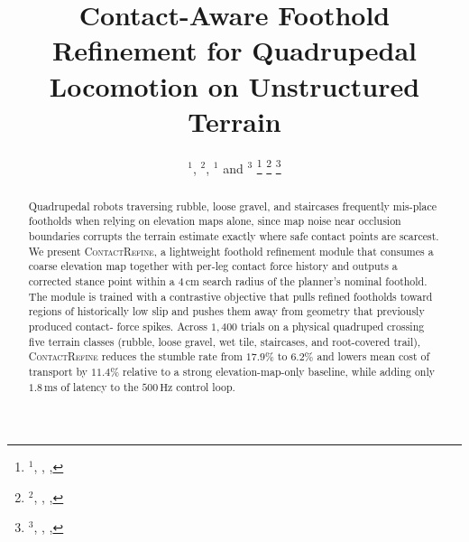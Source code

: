 \documentclass[letterpaper, 10 pt, conference]{ieeeconf}
\title{\LARGE \bf
Contact-Aware Foothold Refinement for Quadrupedal Locomotion on Unstructured Terrain}
\author{\censor{Femi Oyelaran}$^{1}$, \censor{Ingrid Roos}$^{2}$, \censor{Sora Tanaka}$^{1}$
and \censor{Manon Delacroix}$^{3}$%
\thanks{$^{1}$\protect\censor{Department of Robotics Engineering},
  \protect\censor{Nimbus Institute of Technology}, \protect\censor{Rindalen, Norway},
  {\tt\small \protect\censor{f.oyelaran@nimbus-tech.example}}}%
\thanks{$^{2}$\protect\censor{Vertex Robotics Laboratory}, \protect\censor{Meridian University},
  \protect\censor{Coimbra, Portugal}, {\tt\small \protect\censor{i.roos@meridian-univ.example}}}%
\thanks{$^{3}$\protect\censor{Applied Autonomy Group}, \protect\censor{Synapse Research},
  \protect\censor{Lyon, France}, {\tt\small \protect\censor{m.delacroix@synapse.example}}}%
}
\begin{document}
\maketitle
\thispagestyle{empty}
\pagestyle{empty}

\noindent{}

\begin{abstract}
Quadrupedal robots traversing rubble, loose gravel, and staircases frequently mis-place
footholds when relying on elevation maps alone, since map noise near occlusion boundaries
corrupts the terrain estimate exactly where safe contact points are scarcest. We present
\textsc{ContactRefine}, a lightweight foothold refinement module that consumes a coarse
elevation map together with per-leg contact force history and outputs a corrected stance
point within a $4\,\text{cm}$ search radius of the planner's nominal foothold. The module is
trained with a contrastive objective that pulls refined footholds toward regions of
historically low slip and pushes them away from geometry that previously produced contact-
force spikes. Across $1{,}400$ trials on a physical quadruped crossing five terrain classes
(rubble, loose gravel, wet tile, staircases, and root-covered trail), \textsc{ContactRefine}
reduces the stumble rate from $17.9\%$ to $6.2\%$ and lowers mean cost of transport by
$11.4\%$ relative to a strong elevation-map-only baseline, while adding only
$1.8\,\text{ms}$ of latency to the $500\,\text{Hz}$ control loop.
\end{abstract}









\balance


\end{document}
